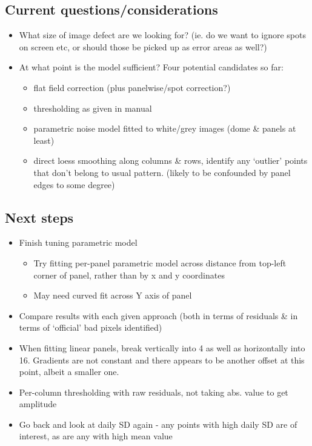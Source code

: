 \documentclass[10pt,fleqn]{article}
\begin{document}
\subsection*{Current questions/considerations}
\begin{itemize}

\item What size of image defect are we looking for? (ie. do we want to ignore spots on screen etc, or should those be picked up as error areas as well?) 

\item At what point is the model sufficient? Four potential candidates so far:

\begin{itemize}
\item flat field correction (plus panelwise/spot correction?)
\item thresholding as given in manual
\item parametric noise model fitted to white/grey images (dome \& panels at least)
\item direct loess smoothing along columns \& rows, identify any `outlier' points that don't belong to usual pattern. (likely to be confounded by panel edges to some degree) 
\end{itemize}

\end{itemize}


\subsection*{Next steps}

\begin{itemize}

\item Finish tuning parametric model

\begin{itemize}
\item Try fitting per-panel parametric model across distance from top-left corner of panel, rather than by x and y coordinates
\item May need curved fit across Y axis of panel

\end{itemize}

\item Compare results with each given approach (both in terms of residuals \& in terms of `official' bad pixels identified)

\item When fitting linear panels, break vertically into 4 as well as horizontally into 16. Gradients are not constant and there appears to be another offset at this point, albeit a smaller one.

\item Per-column thresholding with raw residuals, not taking abs. value to get amplitude

\item Go back and look at daily SD again - any points with high daily SD are of interest, as are any with high mean value


\end{itemize}
\end{document}
